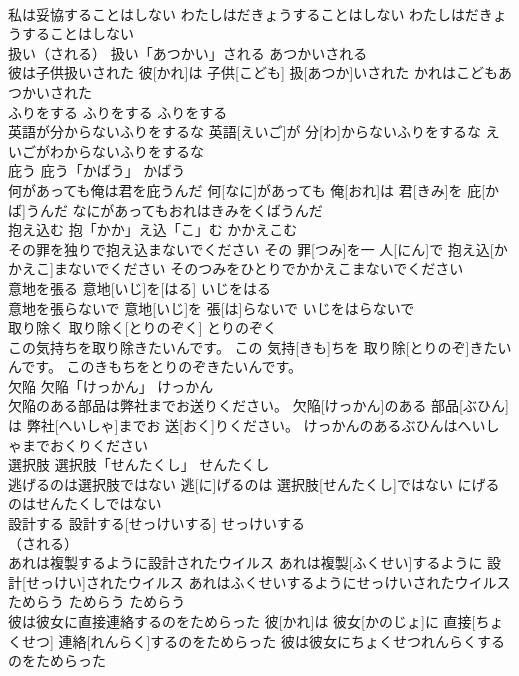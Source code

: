 \documentclass[8pt]{extreport}
\begin{document}
\begin{CJK}{UTF8}{min}
\\	私は妥協することはしない	わたしはだきょうすることはしない	わたしはだきょうすることはしない	
\\	扱い（される）	扱い「あつかい」される	あつかいされる	
\\	彼は子供扱いされた	彼[かれ]は 子供[こども] 扱[あつか]いされた	かれはこどもあつかいされた	
\\	ふりをする	ふりをする	ふりをする	
\\	英語が分からないふりをするな	英語[えいご]が 分[わ]からないふりをするな	えいごがわからないふりをするな	
\\	庇う	庇う「かばう」	かばう	
\\	何があっても俺は君を庇うんだ	何[なに]があっても 俺[おれ]は 君[きみ]を 庇[かば]うんだ	なにがあってもおれはきみをくばうんだ	
\\	抱え込む	抱「かか」え込「こ」む	かかえこむ	
\\	その罪を独りで抱え込まないでください	その 罪[つみ]を一 人[にん]で 抱え込[かかえこ]まないでください	そのつみをひとりでかかえこまないでください	
\\	意地を張る	意地[いじ]を[はる]	いじをはる	
\\	意地を張らないで	意地[いじ]を 張[は]らないで	いじをはらないで	
\\	取り除く	取り除く[とりのぞく]	とりのぞく	
\\	この気持ちを取り除きたいんです。	この 気持[きも]ちを 取り除[とりのぞ]きたいんです。	このきもちをとりのぞきたいんです。	
\\	欠陥	欠陥「けっかん」	けっかん	
\\	欠陥のある部品は弊社までお送りください。	欠陥[けっかん]のある 部品[ぶひん]は 弊社[へいしゃ]までお 送[おく]りください。	けっかんのあるぶひんはへいしゃまでおくりください	
\\	選択肢	選択肢「せんたくし」	せんたくし	
\\	逃げるのは選択肢ではない	逃[に]げるのは 選択肢[せんたくし]ではない	にげるのはせんたくしではない	
\\	設計する	設計する[せっけいする]	せっけいする	
\\	（される）		
\\	あれは複製するように設計されたウイルス	あれは複製[ふくせい]するように 設計[せっけい]されたウイルス	あれはふくせいするようにせっけいされたウイルス	
\\	ためらう	ためらう	ためらう	
\\	彼は彼女に直接連絡するのをためらった	彼[かれ]は 彼女[かのじょ]に 直接[ちょくせつ] 連絡[れんらく]するのをためらった	彼は彼女にちょくせつれんらくするのをためらった	

\end{CJK}
\end{document}

